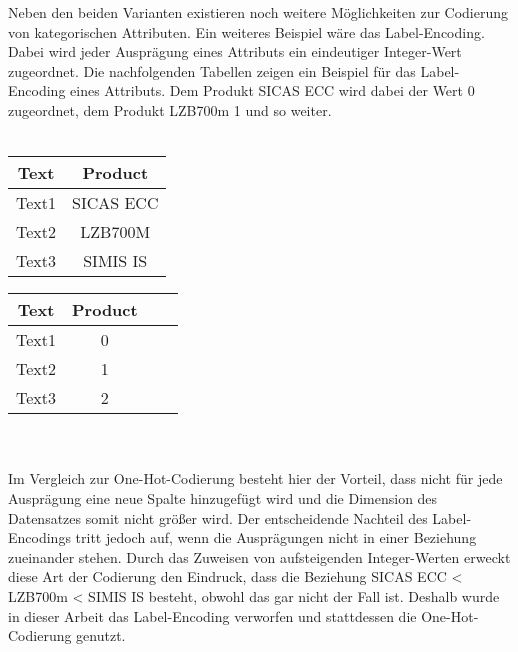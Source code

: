 Neben den beiden Varianten existieren noch weitere Möglichkeiten zur Codierung von kategorischen Attributen. Ein weiteres Beispiel wäre das Label-Encoding. Dabei wird jeder Ausprägung eines Attributs
ein eindeutiger Integer-Wert zugeordnet. Die nachfolgenden Tabellen zeigen ein Beispiel für das Label-Encoding eines Attributs. Dem Produkt \glqq SICAS ECC\grqq{} wird dabei der Wert 0 zugeordnet,
dem Produkt \glqq LZB700m\grqq{} 1 und so weiter. 
\\
\\
\begin{minipage}[c]{0.5\textwidth}
    \centering
    \begin{tabular}{|c|c|}
        \hline
        \textbf{Text} & \textbf{Product}\\ \hline
        Text1 & SICAS ECC\\
        Text2 & LZB700M\\
        Text3 & SIMIS IS\\
        \hline
    \end{tabular}
\end{minipage}
\begin{minipage}[c]{0.5\textwidth}
    \centering
    \begin{tabular}{|c|c|c|c|}
        \hline
        \textbf{Text} & \textbf{Product} \\ \hline
        Text1 & 0\\
        Text2 & 1\\
        Text3 & 2\\
        \hline
    \end{tabular}
\end{minipage}
\\
\\
Im Vergleich zur One-Hot-Codierung besteht hier der Vorteil, dass nicht für jede Ausprägung eine neue Spalte hinzugefügt wird und 
die Dimension des Datensatzes somit nicht größer wird. Der entscheidende Nachteil des Label-Encodings tritt jedoch auf, wenn die Ausprägungen nicht in einer Beziehung zueinander stehen.
Durch das Zuweisen von aufsteigenden Integer-Werten erweckt diese Art der Codierung den Eindruck, dass die Beziehung \glqq SICAS ECC\grqq{} < \glqq LZB700m\grqq{} < \glqq SIMIS IS\grqq{} besteht,
obwohl das gar nicht der Fall ist. Deshalb wurde in dieser Arbeit das Label-Encoding verworfen und stattdessen die One-Hot-Codierung genutzt.
